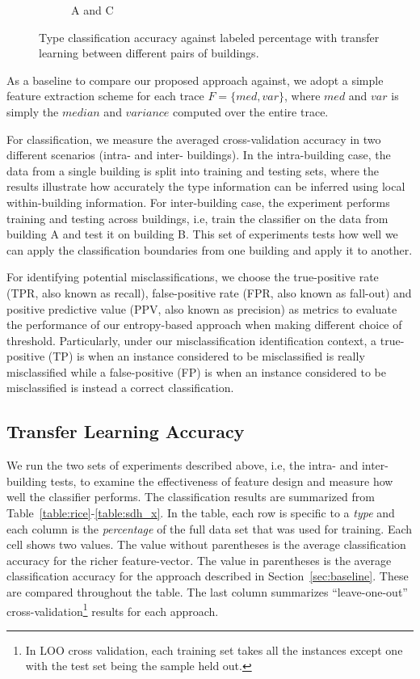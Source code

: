 \begin{figure}[ht!]
\begin{subfigure}{0.32\textwidth}
                \caption{A and C}
  \end{subfigure}
\caption{Type classification accuracy against labeled percentage with transfer learning between different pairs of buildings.}
\label{fig:tl_acc}
\end{figure}


As a baseline to compare our proposed approach against, we adopt a simple feature extraction scheme for each trace $F=\{med, var\}$, where $med$ and $var$ is simply 
the $median$ and $variance$ computed over the entire trace.

For classification, we measure the averaged cross-validation accuracy in two different scenarios (intra- and inter- buildings). In the intra-building case, the 
data from a single building is split into training and testing sets, where the results illustrate how accurately the type information can be inferred using local 
within-building information. For inter-building case, the experiment performs training and testing across buildings, i.e, train the classifier on the data from building A 
and test it on building B.  
This set of experiments tests how well we can apply the classification boundaries from one building and apply it to another.

For identifying potential misclassifications, we choose the true-positive rate (TPR, also known as recall), false-positive rate (FPR, also known as fall-out) and positive predictive 
value (PPV, also known as precision) as metrics to evaluate the performance of our entropy-based approach when making different choice of threshold. Particularly, under our misclassification
identification context, a true-positive (TP) is when an instance considered to be misclassified is really misclassified while a false-positive (FP) is when an instance considered to be misclassified 
is instead a correct classification.

\subsection{Transfer Learning Accuracy}
We run the two sets of experiments described above, i.e, the intra- and inter- building tests, to examine the effectiveness of feature design and measure how well 
the classifier performs. The classification results are summarized from Table~\ref{table:rice}-\ref{table:sdh_x}. %
In the table, each row is specific to a \emph{type} and each column is the \emph{percentage} of the full data set that was used for training.
Each cell shows two values.  The value without parentheses is the average classification accuracy for the richer feature-vector. 
The value in parentheses is the average classification accuracy for the approach described in 
Section~\ref{sec:baseline}. These are compared throughout the table.
The last column summarizes ``leave-one-out'' cross-validation\footnote{In LOO cross validation, each training set takes all the instances except one with the test set being 
the sample held out.} results for each approach.


